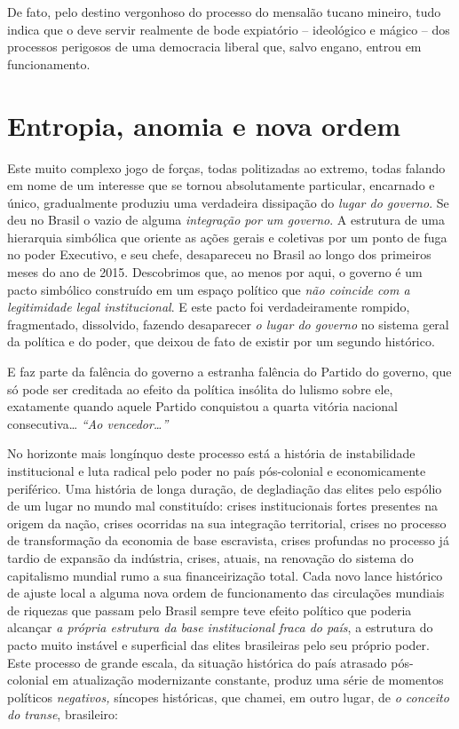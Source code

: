 De fato, pelo destino vergonhoso do processo do mensalão tucano mineiro,
tudo indica que o  deve servir realmente de bode expiatório --
ideológico e mágico -- dos processos perigosos de uma democracia liberal
que, salvo engano, entrou em funcionamento.

  \section{Entropia, anomia e nova
  ordem}\label{entropia-anomia-e-nova-ordem}

Este muito complexo jogo de forças, todas politizadas ao extremo, todas
falando em nome de um interesse que se tornou absolutamente particular,
encarnado e único, gradualmente produziu uma verdadeira dissipação do
\emph{lugar do governo}. Se deu no Brasil o vazio de alguma
\emph{integração por um governo}. A estrutura de uma hierarquia
simbólica que oriente as ações gerais e coletivas por um ponto de fuga
no poder Executivo, e seu chefe, desapareceu no Brasil ao longo dos
primeiros meses do ano de 2015. Descobrimos que, ao menos por aqui, o
governo é um pacto simbólico construído em um espaço político que
\emph{não coincide com a legitimidade legal institucional}. E este pacto
foi verdadeiramente rompido, fragmentado, dissolvido, fazendo desaparecer
\emph{o lugar do governo} no sistema geral da política e do poder, que
deixou de fato de existir por um segundo histórico.

E faz parte da falência do governo a estranha falência do Partido do
governo, que só pode ser creditada ao efeito da política insólita do
lulismo sobre ele, exatamente quando aquele Partido conquistou a quarta
vitória nacional consecutiva… \emph{``Ao vencedor…''}

No horizonte mais longínquo deste processo está a história de
instabilidade institucional e luta radical pelo poder no país
pós-colonial e economicamente periférico. Uma história de longa duração,
de degladiação das elites pelo espólio de um lugar no mundo mal
constituído: crises institucionais fortes presentes na origem da nação,
crises ocorridas na sua integração territorial, crises no processo de
transformação da economia de base escravista, crises profundas no
processo já tardio de expansão da indústria, crises, atuais, na
renovação do sistema do capitalismo mundial rumo a sua financeirização
total. Cada novo lance histórico de ajuste local a alguma nova ordem de
funcionamento das circulações mundiais de riquezas que passam pelo
Brasil sempre teve efeito político que poderia alcançar \emph{a própria
estrutura da base institucional fraca do país}, a estrutura do pacto
muito instável e superficial das elites brasileiras pelo seu próprio
poder. Este processo de grande escala, da situação histórica do país
atrasado pós-colonial em atualização modernizante constante, produz uma
série de momentos políticos \emph{negativos,} síncopes históricas, que
chamei, em outro lugar, de \emph{o conceito do transe}, brasileiro:

